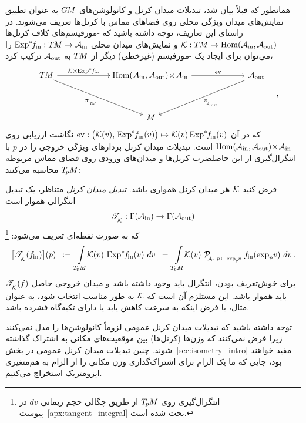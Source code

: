 همانطور که قبلاً بیان شد، تبدیلات میدان کرنل و کانولوشن‌های $G\mkern-1.4muM$ به عنوان تطبیق نمایش‌های میدان ویژگی محلی روی فضاهای مماس با کرنل‌ها تعریف می‌شوند.
در راستای این تعاریف، توجه داشته باشید که -مورفیسم‌های کلاف کرنل‌ها $\mathcal{K}: T\mkern-1.5muM \to \operatorname{Hom}(\mathcal{A}_\textup{in},\mathcal{A}_\textup{out})$ و نمایش‌های میدان محلی $\operatorname{Exp}^*\mkern-5mu f_\textup{\;\!\!in}: T\mkern-1.5muM \to \mathcal{A}_\textup{in}$ را می‌توان برای ایجاد یک -مورفیسم (غیرخطی) دیگر از $T\mkern-1.5muM$ به $\mathcal{A}_\textup{out}$ ترکیب کرد،
\begin{equation}\label{eq:integrand_bundle_map}
    \quad
    \begin{tikzcd}[row sep=3.5em, column sep=6.5em]
        \TM  \arrow[rd, start anchor={[xshift=-1ex]}, "\piTM"']
            \arrow[r, "\K \mkern-1mu\times\mkern-1mu \Expsfin"]
        &
        \mkern-3mu
        \Hom(\Ain,\Aout) \!\times\! \Ain
            \arrow[r, "\ev"]
        &
        \Aout
            \arrow[ld, "\piAout"] \\
        & M &
    \end{tikzcd}
    \quad,
\end{equation}
که در آن $\operatorname{ev}: \big(\mathcal{K}(v),\, \operatorname{Exp}^*\mkern-5mu f_\textup{\;\!\!in}(v)\big) \mapsto \mathcal{K}(v) \operatorname{Exp}^*\mkern-5mu f_\textup{\;\!\!in}(v)$ نگاشت ارزیابی روی $\operatorname{Hom}(\mathcal{A}_\textup{in},\mathcal{A}_\textup{out}) \!\times\! \mathcal{A}_\textup{in}$ است.
تبدیلات میدان کرنل بردارهای ویژگی خروجی را در $p$ با انتگرال‌گیری از این حاصلضرب کرنل‌ها و میدان‌های ورودی روی فضای مماس مربوطه $T_{\mkern-1.5mu p}\mkern-.5muM$ محاسبه می‌کنند:
\begin{dfn}
\label{dfn:kernel_field_trafo}
    فرض کنید $\mathcal{K}$ هر میدان کرنل همواری باشد.
    \emph{تبدیل میدان کرنل} متناظر، یک تبدیل انتگرالی هموار است
    \begin{align}\label{eq:kernel_field_trafo_def_signature}
        \mathscr{T}_{\overset{}{\mkern-0mu \mathcal{K}}}: \Gamma(\mathcal{A}_\textup{in})\to \Gamma(\mathcal{A}_\textup{out})
    \end{align}
    که به صورت نقطه‌ای تعریف می‌شود:%
    \footnote{
        انتگرال‌گیری روی $T_{\mkern-1.5mu p}\mkern-.5muM$ از طریق چگالی حجم ریمانی $dv$ در پیوست~\ref{apx:tangent_integral} بحث شده است.
    }
    \begin{align}\label{eq:kernel_field_trafo_def_ptwise}
        \big[ \TK (\fin)\big] (p)
        \,\ :=\, \int\limits_{\TpM}\!\!
            \K(v) \,
            \Expsfin (v)
            \ dv
        \,\ =\, \int\limits_{\TpM}\!\!
            \K(v) \ 
            \PAinexppv \; \fin(\exp_p\!v)
            \ dv \,.
    \end{align}
    برای خوش‌تعریف بودن، انتگرال باید وجود داشته باشد و میدان خروجی حاصل $\mathscr{T}_{\overset{}{\mkern-0mu \mathcal{K}}}(f)$ باید هموار باشد.
    این مستلزم آن است که $\mathcal{K}$ به طور مناسب انتخاب شود، به عنوان مثال، با فرض اینکه به سرعت کاهش یابد یا دارای تکیه‌گاه فشرده باشد.
\end{dfn}
توجه داشته باشید که تبدیلات میدان کرنل عمومی لزوماً کانولوشن‌ها را مدل نمی‌کنند زیرا فرض نمی‌کنند که وزن‌ها (کرنل‌ها) بین موقعیت‌های مکانی به اشتراک گذاشته شوند.
چنین تبدیلات میدان کرنل عمومی در بخش~\ref{sec:isometry_intro} مفید خواهند بود، جایی که ما یک الزام برای اشتراک‌گذاری وزن مکانی را از الزام به هم‌متغیری ایزومتریک استخراج می‌کنیم.


